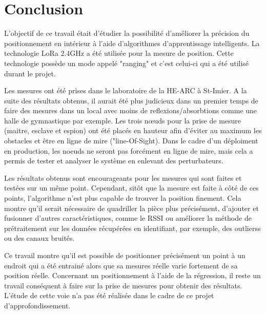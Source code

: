 \chapter{Conclusion}
L'objectif de ce travail était d'étudier la possibilité d'améliorer la précision du positionnement en intérieur à l'aide d'algorithmes d'apprentissage intelligents. La technologie LoRa 2.4GHz a été utilisée pour la mesure de position. Cette technologie possède un mode appelé "ranging" et c'est celui-ci qui a été utilisé durant le projet. 

Les mesures ont été prises dans le laboratoire de la HE-ARC à St-Imier. A la suite des résultats obtenus, il aurait été plus judicieux dans un premier temps de faire des mesures dans un local avec moins de reflexions/absorbtions comme une halle de gymnastique par exemple. Les trois nœuds pour la prise de mesure (maitre, esclave et espion) ont été placés en hauteur afin d'éviter au maximum les obstacles et être en ligne de mire ("line-Of-Sight). Dans le cadre d'un déploiment en production, les noeuds ne seront pas forcément en ligne de mire, mais cela a permis de tester et analyser le système en enlevant des perturbateurs. 

Les résultats obtenus sont encourageants pour les mesures qui sont faites et testées sur un même point. Cependant, sitôt que la mesure est faite à côté de ces points, l'algorithme n'est plus capable de trouver la position finement. Cela montre qu'il serait nécessaire de quadriller la pièce plus précisément, d'ajouter et fusionner d'autres caractéristiques, comme le RSSI ou améliorer la méthode de prétraitement sur les données récupérées en identifiant, par exemple, des outlierss ou des canaux bruités. 

Ce travail montre qu'il est possible de positionner précisément un point à un endroit qui a été entrainé alors que sa mesures réelle varie fortement de sa position réelle. Concernant un positionnement à l'aide de la régression, il reste un travail conséquent à faire sur la prise de mesures pour obtenir des résultats. L'étude de cette voie n'a pas été réalisée dans le cadre de ce projet d'approfondissement. 









